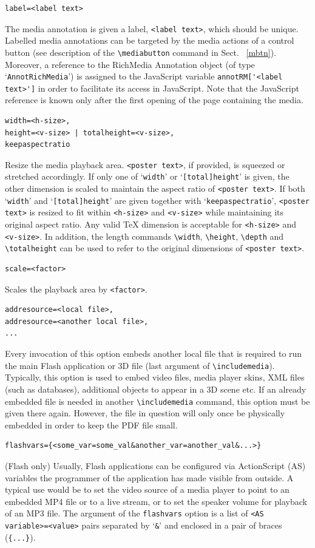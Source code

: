 \documentclass[a4paper]{article}
\begin{document}
\begin{verbatim}
label=<label text>
\end{verbatim}
The media annotation is given a label, \verb+<label text>+, which should be unique. Labelled media annotations can be targeted by the media actions of a control button (see description of the \verb+\mediabutton+ command in Sect. ~\ref{mbtn}). Moreover, a reference to the RichMedia Annotation object (of type `\verb+AnnotRichMedia+') is assigned to the JavaScript variable \verb+annotRM['<label text>']+ in order to facilitate its access in JavaScript. Note that the JavaScript reference is known only after the first opening of the page containing the media.
\begin{verbatim}
width=<h-size>,
height=<v-size> | totalheight=<v-size>,
keepaspectratio
\end{verbatim}
Resize the media playback area. \verb+<poster text>+, if provided, is squeezed or stretched accordingly. If only one of `\verb+width+' or `\verb+[total]height+' is given, the other dimension is scaled to maintain the aspect ratio of \verb+<poster text>+. If both `\verb+width+' and `\verb+[total]height+' are given together with `\verb+keepaspectratio+', \verb+<poster text>+ is resized to fit within \verb+<h-size>+ and \verb+<v-size>+ while maintaining its original aspect ratio. Any valid \TeX{} dimension is acceptable for \verb+<h-size>+ and \verb+<v-size>+. In addition, the length commands \verb+\width+, \verb+\height+, \verb+\depth+ and \verb+\totalheight+ can be used to refer to the original dimensions of \verb+<poster text>+.
\begin{verbatim}
scale=<factor>
\end{verbatim}
Scales the playback area by \verb+<factor>+.
\begin{verbatim}
addresource=<local file>,
addresource=<another local file>,
...
\end{verbatim}
Every invocation of this option embeds another local file that is required to run the main Flash application or 3D file (last argument of \verb+\includemedia+). Typically, this option is used to embed video files, media player skins, XML files (such as databases), additional objects to appear in a 3D scene etc. If an already embedded file is needed in another \verb+\includemedia+ command, this option must be given there again. However, the file in question will only once be physically embedded in order to keep the PDF file small.
\begin{verbatim}
flashvars={<some_var=some_val&another_var=another_val&...>}
\end{verbatim}
(Flash only) Usually, Flash applications can be configured via ActionScript (AS) variables the programmer of the application has made visible from outside. A typical use would be to set the video source of a media player to point to an embedded MP4 file or to a live stream, or to set the speaker volume for playback of an MP3 file. The argument of the \verb+flashvars+ option is a list of \verb+<AS variable>=<value>+ pairs separated by `\verb+&+' and enclosed in a pair of braces (\verb+{...}+).
\end{document}
